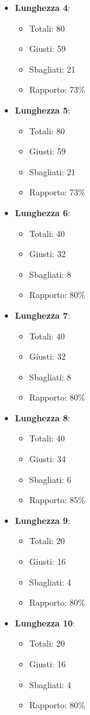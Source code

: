 \documentclass[a4paper, 12pt]{article}
\begin{document}
\begin{itemize}
\item \textbf{Lunghezza 4}:
\begin{itemize}
\item Totali: 80
\item Giusti: 59
\item Sbagliati: 21
\item Rapporto: 73\%
\end{itemize}
\item \textbf{Lunghezza 5}:
\begin{itemize}
\item Totali: 80
\item Giusti: 59
\item Sbagliati: 21
\item Rapporto: 73\%
\end{itemize}
\item \textbf{Lunghezza 6}:
\begin{itemize}
\item Totali: 40
\item Giusti: 32
\item Sbagliati: 8
\item Rapporto: 80\%
\end{itemize}
\item \textbf{Lunghezza 7}:
\begin{itemize}
\item Totali: 40
\item Giusti: 32
\item Sbagliati: 8
\item Rapporto: 80\%
\end{itemize}
\item \textbf{Lunghezza 8}:
\begin{itemize}
\item Totali: 40
\item Giusti: 34 
\item Sbagliati: 6
\item Rapporto: 85\%
\end{itemize}
\item \textbf{Lunghezza 9}:
\begin{itemize}
\item Totali: 20
\item Giusti: 16
\item Sbagliati: 4
\item Rapporto: 80\%
\end{itemize}
\item \textbf{Lunghezza 10}:
\begin{itemize}
\item Totali: 20
\item Giusti: 16
\item Sbagliati: 4
\item Rapporto: 80\%
\end{itemize}
\end{itemize}
\end{document}

